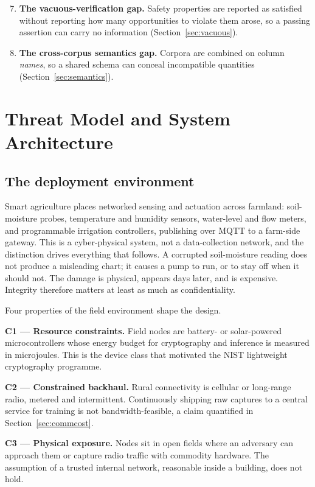 \documentclass[conference]{IEEEtran}
\begin{document}
\begin{enumerate}\setcounter{enumi}{6}
  \item \textbf{The vacuous-verification gap.} Safety properties are reported as satisfied
  without reporting how many opportunities to violate them arose, so a passing assertion can
  carry no information (Section~\ref{sec:vacuous}).
  \item \textbf{The cross-corpus semantics gap.} Corpora are combined on column \emph{names}, so
  a shared schema can conceal incompatible quantities (Section~\ref{sec:semantics}).
\end{enumerate}

\section{Threat Model and System Architecture}\label{sec:threat}

\subsection{The deployment environment}
Smart agriculture places networked sensing and actuation across farmland: soil-moisture probes,
temperature and humidity sensors, water-level and flow meters, and programmable irrigation
controllers, publishing over MQTT to a farm-side gateway. This is a cyber-physical system, not a
data-collection network, and the distinction drives everything that follows. A corrupted
soil-moisture reading does not produce a misleading chart; it causes a pump to run, or to stay off
when it should not. The damage is physical, appears days later, and is expensive. Integrity
therefore matters at least as much as confidentiality.

Four properties of the field environment shape the design.

\textbf{C1 --- Resource constraints.} Field nodes are battery- or solar-powered
microcontrollers whose energy budget for cryptography and inference is measured in microjoules.
This is the device class that motivated the NIST lightweight cryptography programme.

\textbf{C2 --- Constrained backhaul.} Rural connectivity is cellular or long-range radio, metered
and intermittent. Continuously shipping raw captures to a central service for training is not
bandwidth-feasible, a claim quantified in Section~\ref{sec:commcost}.

\textbf{C3 --- Physical exposure.} Nodes sit in open fields where an adversary can approach them
or capture radio traffic with commodity hardware. The assumption of a trusted internal network,
reasonable inside a building, does not hold.
\end{document}
